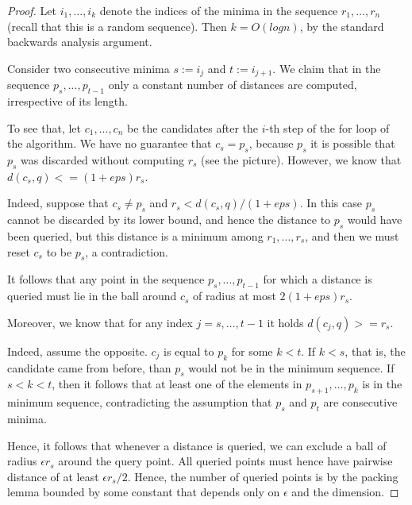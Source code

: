 \documentclass[a4paper,USenglish]{socg-lipics-v2018}
\newcommand{\eps}{\epsilon}
\begin{document}
\begin{proof}
Let $i_1,...,i_k$ denote the indices of the minima in the sequence $r_1, \dots, r_n$
    (recall that this is a random sequence). Then $k=O(log n)$,
    by the standard backwards analysis argument.


    Consider two consecutive minima  $s:=i_j$ and $t:=i_{j+1}$. We claim that in the sequence
$p_s,...,p_{t-1}$
only a constant number of distances are computed, irrespective of its length.

To see that, let $c_1,...,c_n$ be the candidates after the $i$-th step of
the for loop of the algorithm. We have no guarantee that $c_s=p_s$, because $p_s$ it is possible
    that $p_s$ was discarded without computing $r_s$ (see the picture). However, we know that
$d(c_s,q)<=(1+eps) r_s$.

Indeed, suppose that $c_s \neq p_s$ and $r_s < d(c_s,q)/(1+eps)$. In this
    case $p_s$ cannot be discarded 
by its lower bound, and hence the distance to $p_s$ would
have been queried, but this distance is a minimum among $r_1, \dots, r_s$,
    and then we must reset $c_s$ to be $p_s$, a contradiction.

It follows that any point in the sequence $p_s,...,p_{t-1}$ for which a
distance is queried must lie in the ball around $c_s$ of radius at most $2(1+eps)r_s$.

Moreover, we know that for any index $j=s,\dots, t-1$ it holds
$d(c_j,q)>=r_s$.

Indeed, assume the opposite. $c_j$ is equal to $p_k$ for some $k<t$. If $k<s$,
that is, the candidate came from before, than $p_s$ would not be in the
minimum sequence. If $s<k<t$, then it follows that at least one of the
elements in $p_{s+1},\dots,p_k$ is in the minimum sequence, contradicting
the assumption that $p_s$ and $p_t$ are consecutive minima.

Hence, it follows that whenever a distance is queried, we can exclude a
ball of radius $\eps r_s$ around the query point. All queried points must
hence have pairwise distance of at least $ \eps r_s / 2$. Hence, the number of
queried points is by the packing lemma bounded by some constant that depends only on $\eps$ and the dimension. 
\end{proof}
\end{document}
